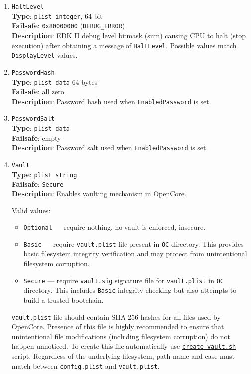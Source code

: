 \documentclass[]{article}
\makeatletter
\providecommand{\tightlist}{%
  \setlength{\itemsep}{0pt}\setlength{\parskip}{0pt}}
\renewcommand{\label}[1]{%
\zref@wrapper@immediate{\oldlabel{#1}}}  %
\makeatother
\begin{document}
\begin{enumerate}
\item
  \texttt{HaltLevel}\\
  \textbf{Type}: \texttt{plist\ integer}, 64 bit\\
  \textbf{Failsafe}: \texttt{0x80000000} (\texttt{DEBUG\_ERROR})\\
  \textbf{Description}: EDK II debug level bitmask (sum) causing CPU to
  halt (stop execution) after obtaining a message of \texttt{HaltLevel}.
  Possible values match \texttt{DisplayLevel} values.

\item
  \texttt{PasswordHash}\\
  \textbf{Type}: \texttt{plist\ data} 64 bytes\\
  \textbf{Failsafe}: all zero\\
  \textbf{Description}: Password hash used when \texttt{EnabledPassword} is set.

\item
  \texttt{PasswordSalt}\\
  \textbf{Type}: \texttt{plist\ data}\\
  \textbf{Failsafe}: empty\\
  \textbf{Description}: Password salt used when \texttt{EnabledPassword} is set.

\item \label{securevaulting}
  \texttt{Vault}\\
  \textbf{Type}: \texttt{plist\ string}\\
  \textbf{Failsafe}: \texttt{Secure}\\
  \textbf{Description}: Enables vaulting mechanism in OpenCore.

  Valid values:

  \begin{itemize}
  \tightlist
  \item \texttt{Optional} --- require nothing, no vault is enforced, insecure.
  \item \texttt{Basic} --- require \texttt{vault.plist} file present
  in \texttt{OC} directory. This provides basic filesystem integrity
  verification and may protect from unintentional filesystem corruption.
  \item \texttt{Secure} --- require \texttt{vault.sig} signature file for
  \texttt{vault.plist} in \texttt{OC} directory. This includes \texttt{Basic}
  integrity checking but also attempts to build a trusted bootchain.
  \end{itemize}

  \texttt{vault.plist} file should contain SHA-256 hashes for all files used by OpenCore.
  Presence of this file is highly recommended to ensure that unintentional
  file modifications (including filesystem corruption) do not happen unnoticed.
  To create this file automatically use
  \href{https://github.com/acidanthera/OpenCorePkg/tree/master/Utilities/CreateVault}{\texttt{create\_vault.sh}} script.
  Regardless of the underlying filesystem, path name and case must match
  between \texttt{config.plist} and \texttt{vault.plist}.


\end{enumerate}
\end{document}
